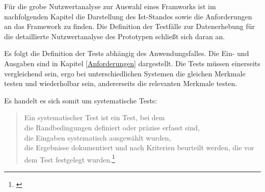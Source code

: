 Für die grobe Nutzwertanalyse zur Auswahl eines Framworks ist im nachfolgenden Kapitel die Darstellung des Ist-Standes sowie die Anforderungen an das Framework zu finden.
Die Definition der Testfälle zur Datenerhebung für die detaillierte Nutzwertanalyse des Prototypen schließt sich daran an.

Es folgt die Definition der Tests abhängig des Anwendungsfalles.
Die Ein- und Ausgaben sind  in Kapitel \ref{Anforderungen} dargestellt.
Die Tests müssen einerseits vergleichend sein, ergo bei unterschiedlichen Systemen die gleichen Merkmale testen und wiederholbar sein, andererseits die relevanten Merkmale testen.

Es handelt es sich somit um systematische Tests:
\begin {quote}
Ein systematischer Test ist ein Test, bei dem\\
die Randbedingungen definiert oder präzise erfasst sind,\\
die Eingaben systematisch ausgewählt wurden,\\
die Ergebnisse dokumentiert und nach Kriterien beurteilt werden, die vor dem Test festgelegt wurden.\footnote{\cite[S.446]{book:softwareengineering}}
\end{quote}

